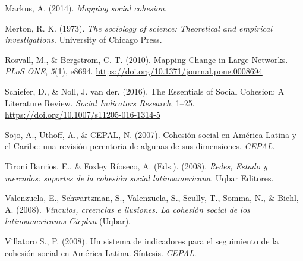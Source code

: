 \documentclass[
  12pt,
]{book}
\newlength{\cslhangindent}
\newlength{\cslentryspacingunit} %
\newenvironment{CSLReferences}[2] %
 {%
  \setlength{\parindent}{0pt}
  \ifodd #1
  \let\oldpar\par
  \def\par{\hangindent=\cslhangindent\oldpar}
  \fi
  \setlength{\parskip}{#2\cslentryspacingunit}
 }%
 {}
\begin{document}
\begin{CSLReferences}{1}{0}
\leavevmode{}%
Markus, A. (2014). \emph{Mapping social cohesion}.

\leavevmode{}%
Merton, R. K. (1973). \emph{The sociology of science: Theoretical and empirical investigations}. {University of Chicago Press}.

\leavevmode{}%
Rosvall, M., \& Bergstrom, C. T. (2010). Mapping {Change} in {Large Networks}. \emph{PLoS ONE}, \emph{5}(1), e8694. \url{https://doi.org/10.1371/journal.pone.0008694}

\leavevmode{}%
Schiefer, D., \& Noll, J. van der. (2016). The {Essentials} of {Social Cohesion}: A {Literature Review}. \emph{Social Indicators Research}, 1--25. \url{https://doi.org/10.1007/s11205-016-1314-5}

\leavevmode{}%
Sojo, A., Uthoff, A., \& CEPAL, N. (2007). {Cohesión social en América Latina y el Caribe: una revisión perentoria de algunas de sus dimensiones}. \emph{CEPAL}.

\leavevmode{}%
Tironi Barrios, E., \& Foxley Ríoseco, A. (Eds.). (2008). \emph{{Redes, Estado y mercados: soportes de la cohesión social latinoamericana}}. {Uqbar Editores}.

\leavevmode{}%
Valenzuela, E., Schwartzman, S., Valenzuela, S., Scully, T., Somma, N., \& Biehl, A. (2008). \emph{{Vínculos, creencias e ilusiones. La cohesión social de los latinoamericanos \textendash{} Cieplan}} (Uqbar).

\leavevmode{}%
Villatoro S., P. (2008). {Un sistema de indicadores para el seguimiento de la cohesión social en América Latina. Síntesis}. \emph{CEPAL}.

\end{CSLReferences}
\end{document}
